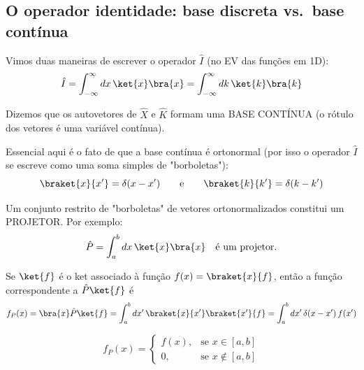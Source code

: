 \subsection*{O operador identidade: base discreta vs.\ base contínua}

Vimos duas maneiras de escrever o operador $\hat{I}$ (no EV das funções em 1D):
\begin{equation}
\hat{I} = \int_{-\infty}^{\infty} dx\,\ket{x}\bra{x} = \int_{-\infty}^{\infty} dk\,\ket{k}\bra{k}
\label{eq:aula7_identidade_duas_formas}
\end{equation}

Dizemos que os autovetores de $\hat{X}$ e $\hat{K}$ formam uma BASE CONTÍNUA (o rótulo dos vetores é uma variável contínua).

Essencial aqui é o fato de que a base contínua é ortonormal (por isso o operador $\hat{I}$ se escreve como uma soma simples de "borboletas"):
\begin{equation}
\braket{x}{x'} = \delta(x-x') \qquad \text{e} \qquad \braket{k}{k'} = \delta(k-k')
\label{eq:aula7_ortonormalidade_continua}
\end{equation}

Um conjunto restrito de "borboletas" de vetores ortonormalizados constitui um PROJETOR. Por exemplo:
\begin{equation}
\hat{P} = \int_a^b dx\,\ket{x}\bra{x} \quad \text{é um projetor.}
\label{eq:aula7_projetor}
\end{equation}

Se $\ket{f}$ é o ket associado à função $f(x) = \braket{x}{f}$, então a função correspondente a $\hat{P}\ket{f}$ é
\begin{equation}
f_P(x) = \bra{x}\hat{P}\ket{f} = \int_a^b dx'\,\braket{x}{x'}\braket{x'}{f} = \int_a^b dx'\,\delta(x-x')\,f(x')
\label{eq:aula7_projetor_acao}
\end{equation}

\begin{equation}
f_P(x) =
\begin{cases}
f(x), & \text{se } x \in [a,b] \\
0, & \text{se } x \notin [a,b]
\end{cases}
\label{eq:aula7_projetor_resultado}
\end{equation}


